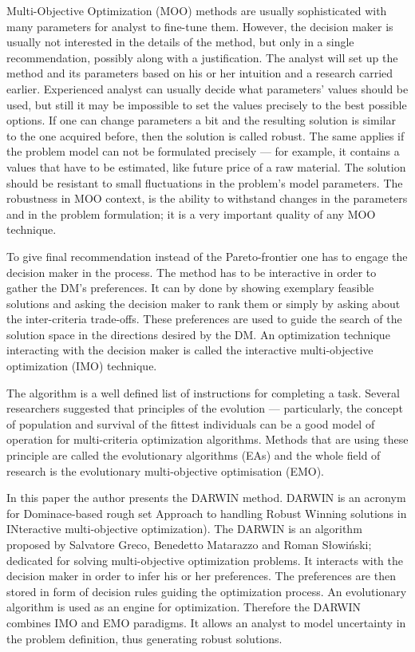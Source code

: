 Multi-Objective Optimization (MOO) methods are usually sophisticated with many
parameters for analyst to fine-tune them. However, the decision maker is
usually not interested in the details of the method, but only in a single
recommendation, possibly along with a justification. The analyst will set up
the method and its parameters based on his or her intuition and a research
carried earlier. Experienced analyst can usually decide what parameters'
values should be used, but still it may be impossible to set the values
precisely to the best possible options. If one can change parameters a bit and
the resulting solution is similar to the one acquired before, then the
solution is called robust. The same applies if the problem model can not be
formulated precisely --- for example, it contains a values that have to be
estimated, like future price of a raw material. The solution should be
resistant to small fluctuations in the problem's model parameters. The
robustness in MOO context, is the ability to withstand changes in the
parameters and in the problem formulation; it is a very important quality of
any MOO technique.

To give final recommendation instead of the Pareto-frontier one has to engage
the decision maker in the process. The method has to be interactive in order
to gather the DM's preferences. It can by done by showing exemplary feasible
solutions and asking the decision maker to rank them or simply by asking about
the inter-criteria trade-offs. These preferences are used to guide the search
of the solution space in the directions desired by the DM. An optimization
technique interacting with the decision maker is called the interactive
multi-objective optimization (IMO) technique.

The algorithm is a well defined list of instructions for completing a
task. Several researchers suggested that principles of the evolution ---
particularly, the concept of population and survival of the fittest
individuals can be a good model of operation for multi-criteria optimization
algorithms. Methods that are using these principle are called the evolutionary
algorithms (EAs) and the whole field of research is the evolutionary
multi-objective optimisation (EMO).

In this paper the author presents the DARWIN method. DARWIN is an acronym for
Dominace-based rough set Approach to handling Robust Winning solutions in
INteractive multi-objective optimization). The DARWIN is an algorithm proposed
by Salvatore Greco, Benedetto Matarazzo and Roman Słowiński; dedicated for
solving multi-objective optimization problems. It interacts with the decision
maker in order to infer his or her preferences. The preferences are then
stored in form of decision rules guiding the optimization process. An
evolutionary algorithm is used as an engine for optimization. Therefore the
DARWIN combines IMO and EMO paradigms. It allows an analyst to model
uncertainty in the problem definition, thus generating robust solutions.

